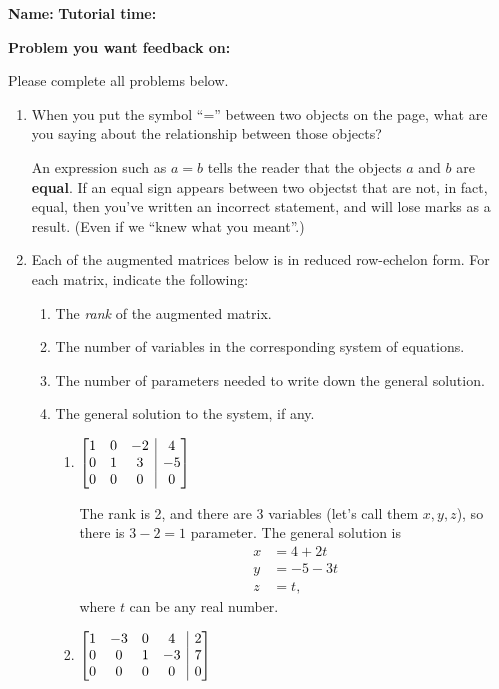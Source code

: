 \documentclass[12pt]{article}
\makeatletter
\newenvironment{amatrix}[1]{%
  \left[\begin{array}{@{}*{#1}{c}|c@{}}
}{%
  \end{array}\right]
}
\newcommand{\di}{\displaystyle}
\newcommand{\bam}{\begin{amatrix}}
\newcommand{\eam}{\end{amatrix}}
\makeatother
\begin{document}
{\bf \large Name:} \hspace{2.5in} {\bf Tutorial time:}

\bigskip

{\bf Problem you want feedback on:}

\bigskip

\thispagestyle{fancy}
Please complete all problems below.
 \begin{enumerate}
 \item When you put the symbol ``='' between two objects on the page, what are you saying about the relationship between those objects?

\bigskip

An expression such as $a=b$ tells the reader that the objects $a$ and $b$ are {\bf equal}. If an equal sign appears between two objectst that are not, in fact, equal, then you've written an incorrect statement, and will lose marks as a result. (Even if we ``knew what you meant''.)

\bigskip

 \item Each of the augmented matrices below is in reduced row-echelon form. For each matrix, indicate the following:

 \begin{enumerate}
  \item The {\em rank} of the augmented matrix.
  \item The number of variables in the corresponding system of equations.
  \item The number of parameters needed to write down the general solution.
  \item The general solution to the system, if any.

\begin{enumerate}
 \item $\di \bam{3} 1&0&-2&4\\0&1&3&-5\\0&0&0&0\eam$

\medskip

The rank is 2, and there are 3 variables (let's call them $x,y,z$), so there is $3-2=1$ parameter. 
The general solution is
\begin{align*}
 x&=4+2t\\
 y&=-5-3t\\
 z&=t,
\end{align*}
where $t$ can be any real number.
 \item $\di \bam{4} 1&-3&0&4&2\\0&0&1&-3&7\\0&0&0&0&0\eam$


\end{enumerate}
\end{enumerate}
\end{enumerate}
\end{document}
